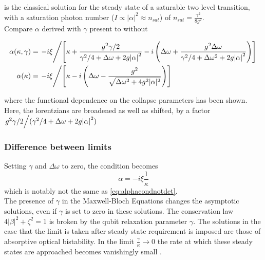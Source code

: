  is the classical solution for the steady state of a saturable two level transition, with a saturation photon number ($I \propto |\alpha|^2 \approx n_{sat}$) of $n_{sat} = \frac{\gamma^2}{8g^2}$.  \\
Compare $\alpha$ derived with $\gamma$ present to without
\begin{widetext}
  \begin{align}
    \alpha(\kappa, \gamma) &= \flatfrac{-i\xi}{\left[ \kappa + \frac{g^2\gamma/2}{\gamma^2/4+\Delta\omega+2g\abs{\alpha}^2} - i\left( \Delta\omega+\frac{g^2\Delta\omega}{\gamma^2/4+\Delta\omega^2 + 2g\abs{\alpha}^2}\right)\right]}\\
            \alpha(\kappa) &= \flatfrac{-i\xi}{\left[\kappa-i\left(\Delta \omega - \frac{g^2}{\sqrt{\Delta \omega^2 +4g^2 |\alpha|^2}}\right)\right]}
  \end{align}
\end{widetext}
where the functional dependence on the collapse parameters has been shown.
Here, the lorentzians are broadened as well as shifted, by a factor $\flatfrac{g^2\gamma/2}{(\gamma^2/4+\Delta\omega + 2g\abs{\alpha}^2)}$
\subsubsection{Difference between limits}
Setting $\gamma$ and $\Delta\omega$ to zero, the condition becomes
\begin{equation}
  \alpha = -i\xi\frac{1}{\kappa}
\end{equation}
which is notably not the same as \cref{eq:alphacondnotdet}.\\

The presence of $\gamma$ in the Maxwell-Bloch Equations changes the asymptotic solutions, even if $\gamma$ is set to zero in these solutions.
The conservation law $4|\beta|^2 +\zeta^2 = 1$ is broken by the qubit relaxation parameter $\gamma$.
The solutions in the case that the limit is taken after steady state requirement is imposed are those of absorptive optical bistability.
In the limit $\frac{\gamma}{\kappa} \rightarrow 0$ the rate at which these steady states are approached becomes vanishingly small
 \cite{Alsing1990}.
